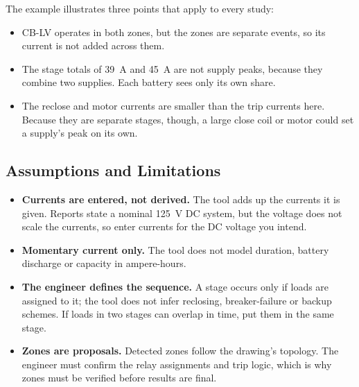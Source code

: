The example illustrates three points that apply to every study:
\begin{itemize}
  \item CB-LV operates in both zones, but the zones are separate events, so its
        current is not added across them.
  \item The stage totals of \SI{39}{A} and \SI{45}{A} are not supply peaks, because
        they combine two supplies. Each battery sees only its own share.
  \item The reclose and motor currents are smaller than the trip currents here. Because
        they are separate stages, though, a large close coil or motor could set a
        supply's peak on its own.
\end{itemize}

\subsection{Assumptions and Limitations}

\begin{itemize}
  \item \textbf{Currents are entered, not derived.} The tool adds up the currents it
        is given. Reports state a nominal \SI{125}{V} DC system, but the voltage does
        not scale the currents, so enter currents for the DC voltage you intend.
  \item \textbf{Momentary current only.} The tool does not model duration, battery
        discharge or capacity in ampere-hours.
  \item \textbf{The engineer defines the sequence.} A stage occurs only if loads are
        assigned to it; the tool does not infer reclosing, breaker-failure or backup
        schemes. If loads in two stages can overlap in time, put them in the same stage.
  \item \textbf{Zones are proposals.} Detected zones follow the drawing's topology. The
        engineer must confirm the relay assignments and trip logic, which is why zones
        must be verified before results are final.
\end{itemize}
